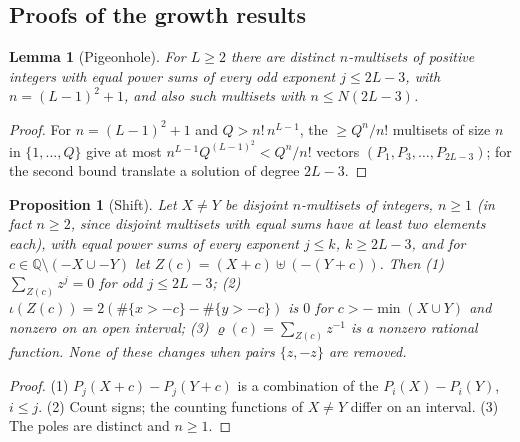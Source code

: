 \documentclass[pdflatex,sn-mathphys-num]{sn-jnl}
\theoremstyle{thmstyleone}%
\newtheorem{lemma}[theorem]{Lemma}%
\newtheorem{proposition}[theorem]{Proposition}%
\theoremstyle{thmstylethree}%
\newcommand{\Q}{\mathbb{Q}}
\begin{document}
\begin{appendices}

\section{Proofs of the growth results}\label{app:pte}

\begin{lemma}[Pigeonhole]\label{lem:pigeon}
For $L\ge2$ there are distinct $n$-multisets of positive integers with equal power sums of every odd exponent $j\le2L-3$, with $n=(L-1)^2+1$, and also such multisets with $n\le N(2L-3)$.
\end{lemma}

\begin{proof}
For $n=(L-1)^2+1$ and $Q>n!\,n^{L-1}$, the $\ge Q^n/n!$ multisets of size $n$ in $\{1,\dots,Q\}$ give at most $n^{L-1}Q^{(L-1)^2}<Q^n/n!$ vectors $(P_1,P_3,\dots,P_{2L-3})$; for the second bound translate a solution of degree $2L-3$.
\end{proof}

\begin{proposition}[Shift]\label{prop:shift}
Let $X\ne Y$ be disjoint $n$-multisets of integers, $n\ge1$ (in fact $n\ge2$, since disjoint multisets with equal sums have at least two elements each), with equal power sums of every exponent $j\le k$, $k\ge2L-3$, and for $c\in\Q\setminus(-X\cup-Y)$ let $Z(c)=(X+c)\uplus(-(Y+c))$. Then (1) $\sum_{Z(c)}z^j=0$ for odd $j\le2L-3$; (2) $\iota(Z(c))=2(\#\{x>-c\}-\#\{y>-c\})$ is $0$ for $c>-\min(X\cup Y)$ and nonzero on an open interval; (3) $\varrho(c)=\sum_{Z(c)}z^{-1}$ is a nonzero rational function. None of these changes when pairs $\{z,-z\}$ are removed.
\end{proposition}

\begin{proof}
(1) $P_j(X+c)-P_j(Y+c)$ is a combination of the $P_i(X)-P_i(Y)$, $i\le j$. (2) Count signs; the counting functions of $X\ne Y$ differ on an interval. (3) The poles are distinct and $n\ge1$.
\end{proof}


\end{appendices}
\end{document}

